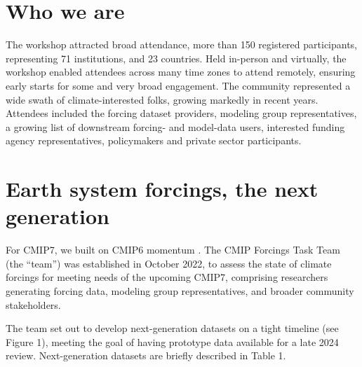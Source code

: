 \documentclass{ametsocV6.1}
\begin{document}
\section*{Who we are}
The workshop attracted broad attendance, more than 150 registered participants, representing 71 institutions, and 23 countries. Held in-person and virtually, the workshop enabled attendees across many time zones to attend remotely, ensuring early starts for some and very broad engagement. The community represented a wide swath of climate-interested folks, growing markedly in recent years. Attendees included the forcing dataset providers, modeling group representatives, a growing list of downstream forcing- and model-data users, interested funding agency representatives, policymakers and private sector participants.

\section*{Earth system forcings, the next generation}
For CMIP7, we built on CMIP6 momentum \citep{durack_toward_2018}. The CMIP Forcings Task Team (the ``team'') was established in October 2022, to assess the state of climate forcings for meeting needs of the upcoming CMIP7, comprising researchers generating forcing data, modeling group representatives, and broader community stakeholders.

The team set out to develop next-generation datasets on a tight timeline (see Figure 1), meeting the goal of having prototype data available for a late 2024 review. Next-generation datasets are briefly described in Table 1.
\end{document}
